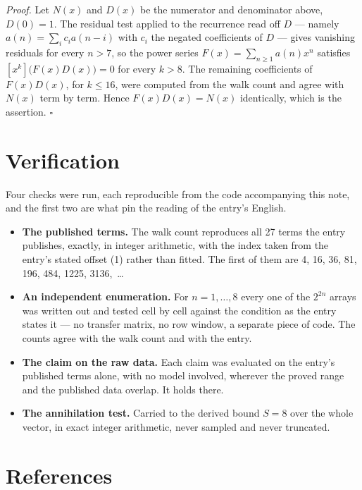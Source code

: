 \documentclass[11pt]{article}
\theoremstyle{definition}
\begin{document}
{\itshape Proof.} Let $N(x)$ and $D(x)$ be the numerator and denominator above, $D(0)=1$. The residual test applied to the recurrence read off $D$ --- namely $a(n) = \sum_i c_i a(n-i)$ with $c_i$ the negated coefficients of $D$ --- gives vanishing residuals for every $n > 7$, so the power series $F(x)=\sum_{n\ge 1}a(n)x^n$ satisfies $[x^k]\bigl(F(x)D(x)\bigr) = 0$ for every $k > 8$. The remaining coefficients of $F(x)D(x)$, for $k \le 16$, were computed from the walk count and agree with $N(x)$ term by term. Hence $F(x)D(x) = N(x)$ identically, which is the assertion. $\square$

\section{Verification}

Four checks were run, each reproducible from the code accompanying this note, and the first two are what pin the reading of the entry's English.

\begin{itemize}

\item {\bfseries The published terms.} The walk count reproduces all 27 terms the entry publishes, exactly, in integer arithmetic, with the index taken from the entry's stated offset (1) rather than fitted. The first of them are 4, 16, 36, 81, 196, 484, 1225, 3136,~\dots

\item {\bfseries An independent enumeration.} For $n = 1,\dots,8$ every one of the $2^{2n}$ arrays was written out and tested cell by cell against the condition as the entry states it --- no transfer matrix, no row window, a separate piece of code. The counts agree with the walk count and with the entry.

\item {\bfseries The claim on the raw data.} Each claim was evaluated on the entry's published terms alone, with no model involved, wherever the proved range and the published data overlap. It holds there.

\item {\bfseries The annihilation test.} Carried to the derived bound $S = 8$ over the whole vector, in exact integer arithmetic, never sampled and never truncated.

\end{itemize}

\section{References}
\end{document}
